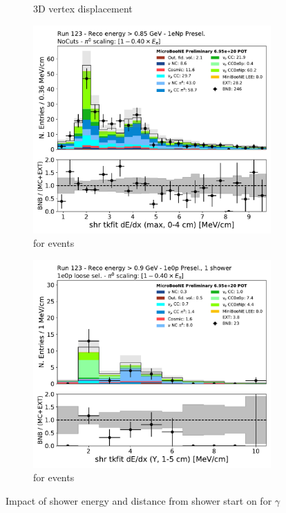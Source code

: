 \begin{figure}[H]
\begin{center}
\begin{subfigure}[b]{0.45\textwidth}
    \caption{\label{fig:tkshdistancedata} 3D vertex displacement}
    \end{subfigure}
    \begin{subfigure}[b]{0.45\textwidth}
    \centering
    \includegraphics[width=1.00\textwidth]{egamma/shr_tkfit_dedx_max_run123_trkpid_lt_m01_tkshdistance_10cm.pdf}
    \caption{\label{fig:dedxdata:1enp} \dedx for \npsel events}
    \end{subfigure}
    \begin{subfigure}[b]{0.45\textwidth}
    \centering
    \includegraphics[width=1.00\textwidth]{1e0p/High_E_Sideband/loose_selection/shr_tkfit_gap10_dedx_Y.pdf}
    \caption{\label{fig:dedxdata:1e0p} \dedx for \zpsel events}
    \end{subfigure}
\caption{\label{fig:egammaseparationdata} Impact of shower energy and distance from shower start on \dedx for  $\gamma$}
\end{center}
\end{figure}

